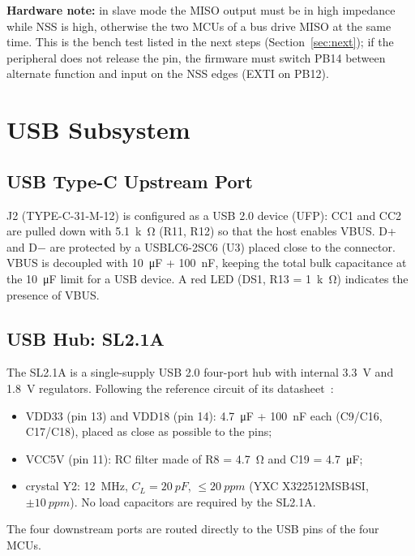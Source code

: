 \documentclass[11pt,a4paper]{article}
\begin{document}
\textbf{Hardware note:} in slave mode the MISO output must be in high impedance while NSS is
high, otherwise the two MCUs of a bus drive MISO at the same time. This is the bench test
listed in the next steps (Section~\ref{sec:next}); if the peripheral does not release the pin, the firmware must
switch PB14 between alternate function and input on the NSS edges (EXTI on PB12).

\section{USB Subsystem}

\subsection{USB Type-C Upstream Port}

J2 (TYPE-C-31-M-12) is configured as a USB 2.0 device (UFP): CC1 and CC2 are pulled down
with \qty{5.1}{k\ohm} (R11, R12) so that the host enables VBUS. D+ and D$-$ are protected by a USBLC6-2SC6
(U3) placed close to the connector. VBUS is decoupled with \qty{10}{\micro F} + \qty{100}{nF}, keeping the
total bulk capacitance at the \qty{10}{\micro F} limit for a USB device. A red LED (DS1, R13 = \qty{1}{k\ohm})
indicates the presence of VBUS.

\subsection{USB Hub: SL2.1A}

The SL2.1A is a single-supply USB 2.0 four-port hub with internal \qty{3.3}{V} and \qty{1.8}{V} regulators.
Following the reference circuit of its datasheet~\cite{sl21a}:
\begin{itemize}
    \item VDD33 (pin 13) and VDD18 (pin 14): \qty{4.7}{\micro F} + \qty{100}{nF} each (C9/C16, C17/C18), placed
    as close as possible to the pins;
    \item VCC5V (pin 11): RC filter made of R8 = \qty{4.7}{\ohm} and C19 = \qty{4.7}{\micro F};
    \item crystal Y2: \qty{12}{MHz}, $C_L = \qty{20}{pF}$, $\leq\qty{20}{ppm}$ (YXC X322512MSB4SI, $\pm\qty{10}{ppm}$). No load
    capacitors are required by the SL2.1A.
\end{itemize}
The four downstream ports are routed directly to the USB pins of the four MCUs.
\end{document}

